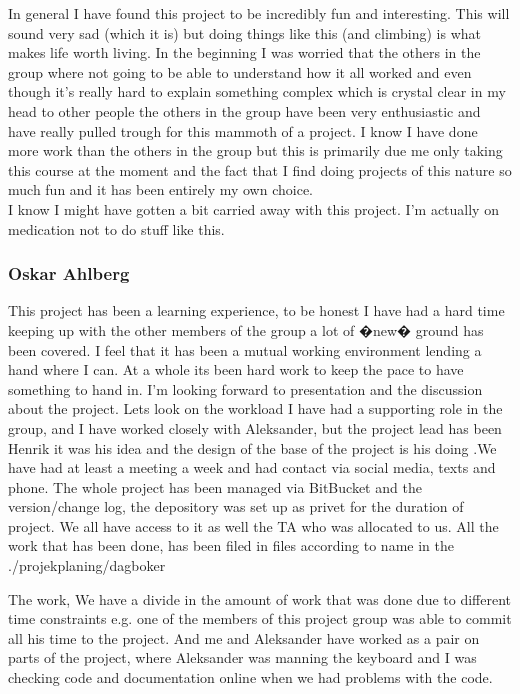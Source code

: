 \documentclass{article}
\begin{document}
In general I have found this project to be incredibly fun and interesting.
This will sound very sad (which it is) but doing things like this (and climbing)
is what makes life worth living. In the beginning I was worried that the others
in the group where not going to be able to understand how it all worked and even
though it's really hard to explain something complex which is crystal clear in
my head to other people the others in
the group have been very enthusiastic and have really pulled trough for this
mammoth of a project. I know I have done more work than the others in the
group but this is primarily due me only taking this course at the moment and
the fact that I find doing projects of this nature so much fun and it has been entirely my own choice.
\\
I know I might have gotten a bit carried away with this project. I'm actually on
medication not to do stuff like this.

\subsubsection{Oskar Ahlberg}
This project has been a learning experience, to be honest I have had a hard time keeping up with the other members of the group a lot of �new� ground has been covered. I feel that it has been a mutual working environment lending a hand where I can. At a whole its been hard work to keep the pace to have something to hand in. I'm looking forward to presentation and the discussion about the project. Lets look on the workload I have had a supporting role in the group, and I have worked  closely with Aleksander, but the project lead has been Henrik it was his idea and the design of the base of the project is his doing .We have had at least a meeting a week and had contact via social media, texts and phone. The whole project has been managed via BitBucket and the version/change log, the depository was set up as privet for the duration of project. We all have access to it as well the TA who was allocated to us. All the work that has been done, has been  filed in files according to name in the ./projekplaning/dagboker

The work,
We have a divide in the amount of work that was done due to different time constraints e.g. one of the members of this project group was able to commit all his time to the project. And me and Aleksander have worked as a pair on parts of the project, where Aleksander was manning the keyboard  and I was checking code and documentation online when we had problems with the code.
\end{document}
